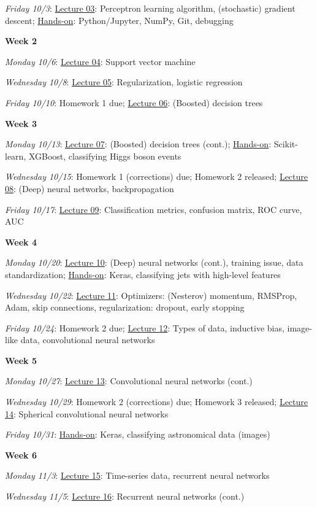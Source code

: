 \documentclass[12pt]{article}
\begin{document}
\emph{Friday 10/3}: \underline{Lecture 03}: Perceptron learning algorithm, (stochastic) gradient descent; \underline{Hands-on}: Python/Jupyter, NumPy, Git, debugging

\noindent\textbf{Week 2}

\emph{Monday 10/6}: \underline{Lecture 04}: Support vector machine

\emph{Wednesday 10/8}: \underline{Lecture 05}: Regularization, logistic regression

\emph{Friday 10/10}: Homework 1 due; \underline{Lecture 06}: (Boosted) decision trees

\noindent\textbf{Week 3}

\emph{Monday 10/13}: \underline{Lecture 07}: (Boosted) decision trees (cont.); \underline{Hands-on}: Scikit-learn, XGBoost, classifying Higgs boson events

\emph{Wednesday 10/15}: Homework 1 (corrections) due; Homework 2 released; \underline{Lecture 08}: (Deep) neural networks, backpropagation

\emph{Friday 10/17}: \underline{Lecture 09}: Classification metrics, confusion matrix, ROC curve, AUC

\noindent\textbf{Week 4}

\emph{Monday 10/20}: \underline{Lecture 10}: (Deep) neural networks (cont.), training issue, data standardization; \underline{Hands-on}: Keras, classifying jets with high-level features

\emph{Wednesday 10/22}: \underline{Lecture 11}: Optimizers: (Nesterov) momentum, RMSProp, Adam, skip connections, regularization: dropout, early stopping

\emph{Friday 10/24}: Homework 2 due; \underline{Lecture 12}: Types of data, inductive bias, image-like data, convolutional neural networks

\noindent\textbf{Week 5}

\emph{Monday 10/27}: \underline{Lecture 13}: Convolutional neural networks (cont.)

\emph{Wednesday 10/29}: Homework 2 (corrections) due; Homework 3 released; \underline{Lecture 14}: Spherical convolutional neural networks

\emph{Friday 10/31}: \underline{Hands-on}: Keras, classifying astronomical data (images)

\noindent\textbf{Week 6}

\emph{Monday 11/3}: \underline{Lecture 15}: Time-series data, recurrent neural networks

\emph{Wednesday 11/5}: \underline{Lecture 16}: Recurrent neural networks (cont.)
\end{document}
